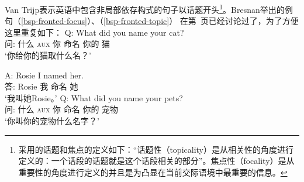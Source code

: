 Van Trijp表示英语中包含非局部依存构式的句子以话题开头\footnote{%
采用的话题和焦点的定义如下：“话题性（topicality）是从相关性的角度进行定义的：一个话段的话题就是这个话段相关的部分”。焦点性（focality）是从重要性的角度进行定义的并且是为凸显在当前交际语境中最重要的信息。
}。Bresnan举出的例句（\ref{bsp-fronted-focus}）、（\ref{bsp-fronted-topic}） 在第~\pageref{bsp-fronted-focus}页\citep[]{Bresnan2001a}已经讨论过了，为了方便这里重复如下：
\ea
\label{bsp-fronted-focus-two}
\gll Q: What did you name your cat?\\  
     问: 什么 \textsc{aux} 你 命名 你的 猫\\
\glt `你给你的猫取什么名？'

\gll A: Rosie I named her. \\
     答: Rosie 我 命名 她\\
\glt `我叫她Rosie。'
\z
\ea
\label{bsp-fronted-topic-two}
\gll Q: What did you name your pets?\\    
     问: 什么 \textsc{aux} 你 命名 你的 宠物\\
\glt `你叫你的宠物什么名字？' 

